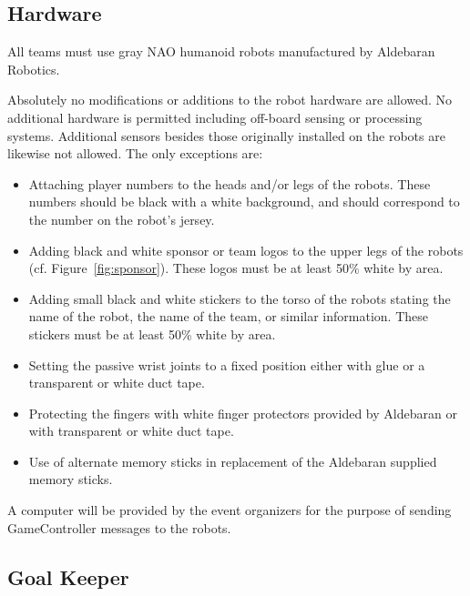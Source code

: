 \documentclass[12pt]{article}
\newcommand{\cf}{\mbox{cf.}\xspace}
\begin{document}
\subsection{Hardware}
\label{sec:hardware}
All teams must use gray NAO humanoid robots manufactured by Aldebaran Robotics. 

Absolutely no modifications or additions to the robot hardware are allowed. No additional hardware is permitted including off-board sensing or processing systems. Additional sensors besides those originally installed on the robots are likewise not allowed. The only exceptions are:

\begin{itemize}

\item Attaching player numbers to the heads and/or legs of the robots.  These numbers should be black with a white background, and should correspond to the number on the robot's jersey.

\item Adding black and white sponsor or team logos to the upper legs of the robots (\cf Figure~\ref{fig:sponsor}). These logos must be at least 50\% white by area.

\item Adding small black and white stickers to the torso of the robots stating the name of the robot, the name of the team, or similar information. These stickers must be at least 50\% white by area.

\item Setting the passive wrist joints to a fixed position either with glue or a transparent or white duct tape.

\item Protecting the fingers with white finger protectors provided by Aldebaran or with transparent or white duct tape.

\item Use of alternate memory sticks in replacement of the Aldebaran supplied memory sticks.

\end{itemize}

A computer will be provided by the event organizers for the purpose of sending GameController messages to the robots.

\subsection{Goal Keeper}
\label{sec:goal_keeper}
\end{document}
